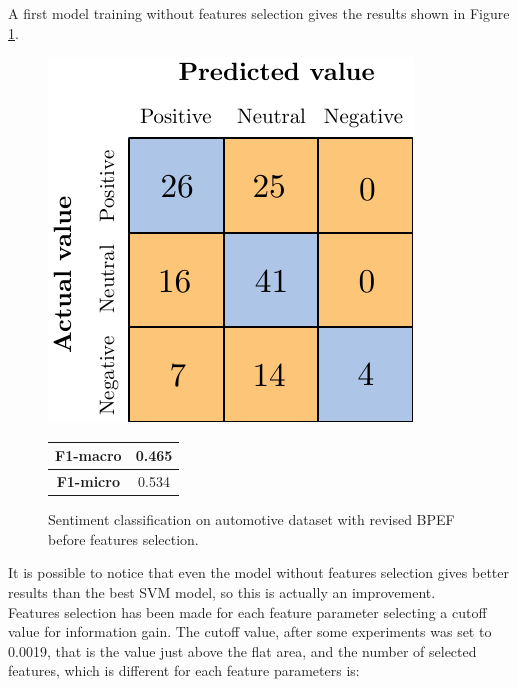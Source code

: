 A first model training without features selection gives the results shown in Figure \ref{fig:ita_snt_bpef_bfs}.

\begin{figure}[H]
	\begin{minipage}[b]{0.6\linewidth}
		\centering
		\includegraphics[scale=1]{figures/conf_matrices/ita_snt_bpef/ita_snt_bpef_bfs.pdf}
	\end{minipage}
	\begin{minipage}[b]{0.3\linewidth}
		\begin{tabular}[b]{ | c | c | } 
			\hline
			\textbf{F1-macro} & 0.465 \\
			\hline
			\textbf{F1-micro} & 0.534 \\ 
			\hline
		\end{tabular}
	\end{minipage}
	\caption{Sentiment classification on automotive dataset with revised BPEF before features selection.}
	\label{fig:ita_snt_bpef_bfs}
\end{figure}

It is possible to notice that even the model without features selection gives better results than the best SVM model, so this is actually an improvement.\\
Features selection has been made for each feature parameter selecting a cutoff value for information gain. The cutoff value, after some experiments was set to 0.0019, that is the value just above the flat area, and the number of selected features, which is different for each feature parameters is:

